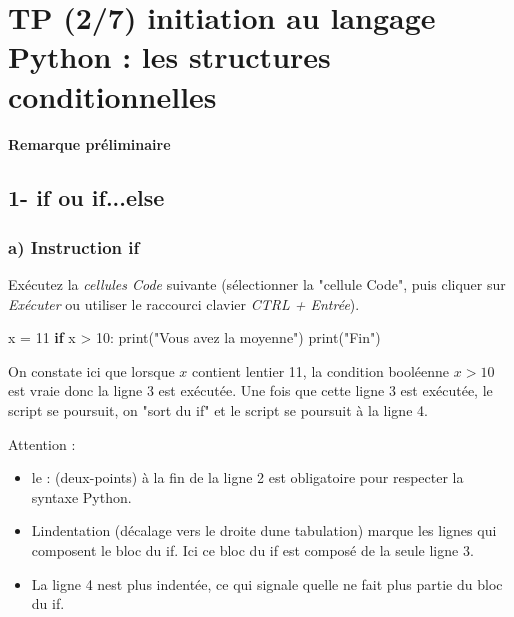 \documentclass[
  paper=a4,
  ,captions=tableheading
]{scrartcl}
\author{}
\date{}
\title{}
\author{}
\date{}
\newenvironment{Shaded}{}{}
\newcommand{\BuiltInTok}[1]{\textcolor[rgb]{0.00,0.50,0.00}{#1}}
\newcommand{\ControlFlowTok}[1]{\textcolor[rgb]{0.00,0.44,0.13}{\textbf{#1}}}
\newcommand{\DecValTok}[1]{\textcolor[rgb]{0.25,0.63,0.44}{#1}}
\newcommand{\NormalTok}[1]{#1}
\newcommand{\OperatorTok}[1]{\textcolor[rgb]{0.40,0.40,0.40}{#1}}
\newcommand{\StringTok}[1]{\textcolor[rgb]{0.25,0.44,0.63}{#1}}
\providecommand{\tightlist}{%
  \setlength{\itemsep}{0pt}\setlength{\parskip}{0pt}}
\begin{document}




\hypertarget{tp-27-initiation-au-langage-python--les-structures-conditionnelles}{%
\section{TP (2/7) initiation au langage Python : les structures
conditionnelles}\label{tp-27-initiation-au-langage-python--les-structures-conditionnelles}}

\textbf{Remarque préliminaire}

\hypertarget{1--if-ou-ifelse}{%
\subsection{1- if ou if...else}\label{1--if-ou-ifelse}}

\hypertarget{a-instruction-if}{%
\subsubsection{a) Instruction if}\label{a-instruction-if}}

Exécutez la \emph{cellules Code} suivante (sélectionner la "cellule
Code", puis cliquer sur \emph{Exécuter} ou utiliser le raccourci clavier
\emph{CTRL + Entrée}).

\begin{Shaded}
\begin{Highlighting}[]
\NormalTok{x }\OperatorTok{=} \DecValTok{11}
\ControlFlowTok{if}\NormalTok{ x }\OperatorTok{\textgreater{}} \DecValTok{10}\NormalTok{:}
    \BuiltInTok{print}\NormalTok{(}\StringTok{"Vous avez la moyenne"}\NormalTok{)}
\BuiltInTok{print}\NormalTok{(}\StringTok{"Fin"}\NormalTok{)}
\end{Highlighting}
\end{Shaded}

On constate ici que lorsque \(x\) contient l\textquotesingle entier 11,
la condition booléenne \(x>10\) est vraie donc la ligne 3 est exécutée.
Une fois que cette ligne 3 est exécutée, le script se poursuit, on "sort
du if" et le script se poursuit à la ligne 4.

Attention :

\begin{itemize}
\tightlist
\item
  le : (deux-points) à la fin de la ligne 2 est obligatoire pour
  respecter la syntaxe Python.
\item
  L\textquotesingle indentation (décalage vers le droite
  d\textquotesingle une tabulation) marque les lignes qui composent le
  bloc du if. Ici ce bloc du if est composé de la seule ligne 3.
\item
  La ligne 4 n\textquotesingle est plus indentée, ce qui signale
  qu\textquotesingle elle ne fait plus partie du bloc du if.
\end{itemize}
\end{document}
